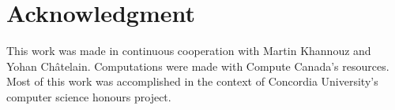 \documentclass[conference]{IEEEtran}
\begin{document}
\section*{Acknowledgment}

This work was made in continuous cooperation with Martin Khannouz and Yohan Châtelain. Computations were made with Compute Canada's resources. Most of this work was accomplished in the context of Concordia University's computer science honours project.




\vspace{12pt}
\end{document}
